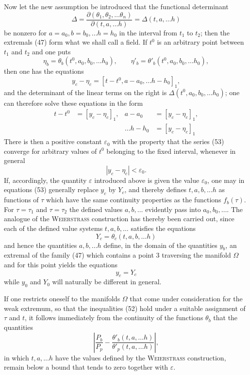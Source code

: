 \documentclass[11pt,a4paper,leqno]{article}
\begin{document}
Now let the new assumption be introduced that the functional determinant
\[
\Delta=
\frac{\partial(\theta_1,\theta_2,\ldots\theta_n)}
{\partial(t,a,\ldots h)}
=\Delta(t,a,\ldots h)
\]
be nonzero for $a=a_0,b=b_0,\ldots h=h_0$ in the interval from $t_1$ to $t_2$; then the extremals (47) form what we shall call a field. If $t^0$ is an arbitrary point between $t_1$ and $t_2$ and one puts
\[
\eta_b=\theta_b(t^0,a_0,b_0,\ldots h_0),
\qquad
\eta'_b=\theta'_b(t^0,a_0,b_0,\ldots h_0),
\]
then one has the equations
\[
y_c-\eta_c=[t-t^0,a-a_0,\ldots h-h_0]_1,
\]
and the determinant of the linear terms on the right is $\Delta(t^0,a_0,b_0,\ldots h_0)$; one can therefore solve these equations in the form
\begin{equation}\tag{53}
\begin{aligned}
t-t^0&=[y_c-\eta_c]_1,
&a-a_0&=[y_c-\eta_c]_1,\\
&&\ldots h-h_0&=[y_c-\eta_c]_1
\end{aligned}
\end{equation}
There is then a positive constant $\varepsilon_0$ with the property that the series (53) converge for arbitrary values of $t^0$ belonging to the fixed interval, whenever in general
\[
|y_c-\eta_c|<\varepsilon_0.
\]
If, accordingly, the quantity $\varepsilon$ introduced above is given the value $\varepsilon_0$, one may in equations (53) generally replace $y_c$ by $Y_c$, and thereby defines $t,a,b,\ldots h$ as functions of $\tau$ which have the same continuity properties as the functions $f_b(\tau)$. For $\tau=\tau_1$ and $\tau=\tau_2$ the defined values $a,b,\ldots$ evidently pass into $a_0,b_0,\ldots$. The analogue of the \textsc{Weierstrass} construction has thereby been carried out, since each of the defined value systems $t,a,b,\ldots$ satisfies the equations
\begin{equation}\tag{54}
Y_c=\theta_c(t,a,b,\ldots h)
\end{equation}
and hence the quantities $a,b,\ldots h$ define, in the domain of the quantities $y_b$, an extremal of the family (47) which contains a point 3 traversing the manifold $\Omega$ and for this point yields the equations
\[
y_c=Y_c
\]
while $y_0$ and $Y_0$ will naturally be different in general.

If one restricts oneself to the manifolds $\Omega$ that come under consideration for the weak extremum, so that the inequalities (52) hold under a suitable assignment of $\tau$ and $t$, it follows immediately from the continuity of the functions $\theta_b$ that the quantities
\begin{equation}\tag{55}
\left|
\frac{P_b}{P_p}
-\frac{\theta'_b(t,a,\ldots h)}{\theta'_p(t,a,\ldots h)}
\right|,
\end{equation}
in which $t,a,\ldots h$ have the values defined by the \textsc{Weierstrass} construction, remain below a bound that tends to zero together with $\varepsilon$.
\end{document}
